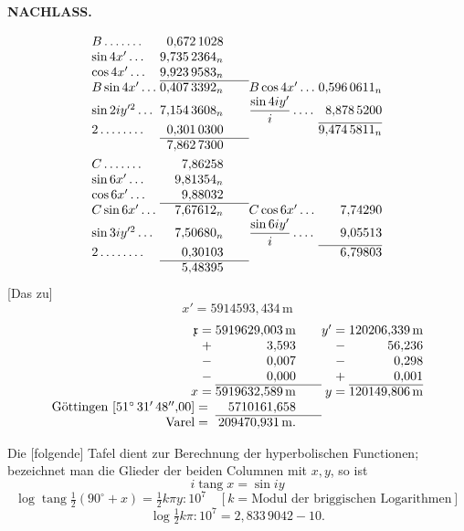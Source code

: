 \par\clearpage
{}\hfill{\small\textbf{NACHLASS.}}\hfill\null\par\medskip
\[
\begin{array}{@{}l@{\;}r@{\qquad}l@{\;}r@{}}
B\,.\,.\,.\,.\,.\,.\,.&0{,}672\,1028&&\\
\sin4x'\,.\,.\,.&9{,}735\,2364_n&&\\
\cos4x'\,.\,.\,.&9{,}923\,9583_n&&\\\cline{2-2}
B\sin4x'\,.\,.\,.&0{,}407\,3392_n&B\cos4x'\,.\,.\,.&0{,}596\,0611_n\\
\sin2iy^{\prime 2}\,.\,.\,.&7{,}154\,3608_n&\dfrac{\sin4iy'}{i}\,.\,.\,.\,.&8{,}878\,5200\\\cline{4-4}
2\,.\,.\,.\,.\,.\,.\,.\,.&0{,}301\,0300&&9{,}474\,5811_n\\\cline{2-2}
&7{,}862\,7300&&\\[3pt]
C\,.\,.\,.\,.\,.\,.\,.&7{,}86258&&\\
\sin6x'\,.\,.\,.&9{,}81354_n&&\\
\cos6x'\,.\,.\,.&9{,}88032&&\\\cline{2-2}
C\sin6x'\,.\,.\,.&7{,}67612_n&C\cos6x'\,.\,.\,.&7{,}74290\\
\sin3iy^{\prime 2}\,.\,.\,.&7{,}50680_n&\dfrac{\sin6iy'}{i}\,.\,.\,.\,.&9{,}05513\\\cline{4-4}
2\,.\,.\,.\,.\,.\,.\,.\,.&0{,}30103&&6{,}79803\\\cline{2-2}
&5{,}48395&&
\end{array}
\]
[Das zu]
\[x'=5914593{,}434\,\mathrm{m}\]
\[
\begin{array}{@{}r@{\;}r@{\qquad}r@{\;}r@{}}
\mathfrak{x}=&5919629{,}003\,\mathrm{m}&y'=&120206{,}339\,\mathrm{m}\\
+&3{,}593&-&56{,}236\\
-&0{,}007&-&0{,}298\\
-&0{,}000&+&0{,}001\\\cline{2-2}\cline{4-4}
x=&5919632{,}589\,\mathrm{m}&y=&120149{,}806\,\mathrm{m}\\
\text{Göttingen }[51^\circ\,31'\,48''{,}00]={}&5710161{,}658&&\\\cline{2-2}
\text{Varel}={}&209470{,}931\,\mathrm{m}.&&
\end{array}
\]
\bigskip
{\centering [30.]\par}
Die [folgende] Tafel dient zur Berechnung der hyperbolischen Functionen; bezeichnet man die Glieder der beiden Columnen mit \(x,y\), so ist
\[i\operatorname{tang}x=\sin iy\]
\[
\log\operatorname{tang}\tfrac12(90^\circ+x)=\tfrac12k\pi y:10^7
\quad[k=\text{Modul der briggischen Logarithmen}]
\]
\[\log\tfrac12k\pi:10^7=2{,}833\,9042-10.\]

